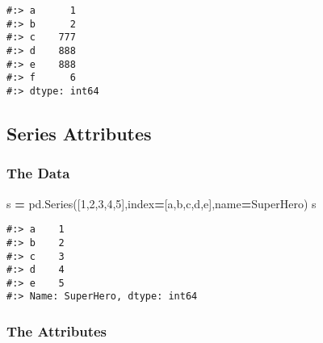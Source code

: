 \documentclass[
]{book}
\newenvironment{Shaded}{\begin{snugshade}}{\end{snugshade}}
\newcommand{\DecValTok}[1]{\textcolor[rgb]{0.06,0.06,0.06}{#1}}
\newcommand{\NormalTok}[1]{#1}
\newcommand{\OperatorTok}[1]{\textcolor[rgb]{0.43,0.43,0.43}{\textbf{#1}}}
\newcommand{\StringTok}[1]{\textcolor[rgb]{0.5,0.5,0.5}{#1}}
\begin{document}
\begin{verbatim}
#:> a      1
#:> b      2
#:> c    777
#:> d    888
#:> e    888
#:> f      6
#:> dtype: int64
\end{verbatim}

\hypertarget{series-attributes}{%
\subsection{Series Attributes}\label{series-attributes}}

\hypertarget{the-data}{%
\subsubsection{The Data}\label{the-data}}

\begin{Shaded}
\begin{Highlighting}[]
\NormalTok{s }\OperatorTok{=}\NormalTok{ pd.Series([}\DecValTok{1}\NormalTok{,}\DecValTok{2}\NormalTok{,}\DecValTok{3}\NormalTok{,}\DecValTok{4}\NormalTok{,}\DecValTok{5}\NormalTok{],index}\OperatorTok{=}\NormalTok{[}\StringTok{\textquotesingle{}a\textquotesingle{}}\NormalTok{,}\StringTok{\textquotesingle{}b\textquotesingle{}}\NormalTok{,}\StringTok{\textquotesingle{}c\textquotesingle{}}\NormalTok{,}\StringTok{\textquotesingle{}d\textquotesingle{}}\NormalTok{,}\StringTok{\textquotesingle{}e\textquotesingle{}}\NormalTok{],name}\OperatorTok{=}\StringTok{\textquotesingle{}SuperHero\textquotesingle{}}\NormalTok{) }
\NormalTok{s}
\end{Highlighting}
\end{Shaded}

\begin{verbatim}
#:> a    1
#:> b    2
#:> c    3
#:> d    4
#:> e    5
#:> Name: SuperHero, dtype: int64
\end{verbatim}

\hypertarget{the-attributes}{%
\subsubsection{The Attributes}\label{the-attributes}}
\end{document}
